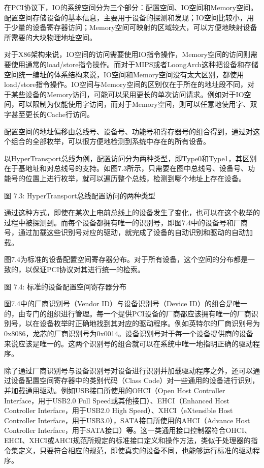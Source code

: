\documentclass[]{ctexbook}
\begin{document}
在PCI协议下，IO的系统空间分为三个部分：配置空间、IO空间和Memory空间。配置空间存储设备的基本信息，主要用于设备的探测和发现；IO空间比较小，用于少量的设备寄存器访问；Memory空间可映射的区域较大，可以方便地映射设备所需要的大块物理地址空间。

对于X86架构来说，IO空间的访问需要使用IO指令操作，Memory空间的访问则需要使用通常的load/store指令操作。而对于MIPS或者LoongArch这种把设备和存储空间统一编址的体系结构来说，IO空间和Memory空间没有太大区别，都使用load/store指令操作。IO空间与Memory空间的区别仅在于所在的地址段不同，对于某些设备的Memory访问，可能可以采用更长的单次访问请求。例如对于IO空间，可以限制为仅能使用字访问，而对于Memory空间，则可以任意地使用字、双字甚至更长的Cache行访问。

配置空间的地址偏移由总线号、设备号、功能号和寄存器号的组合得到，通过对这个组合的全部枚举，可以很方便地检测到系统中存在的所有设备。

以HyperTransport总线为例，配置访问分为两种类型，即Type0和Type1，其区别在于基地址和对总线号的支持。如图7.3所示，只需要在图中总线号、设备号、功能号的位置上进行枚举，就可以遍历整个总线，检测到哪个地址上存在设备。

图 7.3: HyperTransport总线配置访问的两种类型

通过这种方式，即使在某次上电前总线上的设备发生了变化，也可以在这个枚举的过程中被探测到。而每个设备都拥有唯一的识别号，即图7.4中的设备号和厂商号，通过加载这些识别号对应的驱动，就完成了设备的自动识别和驱动的自动加载。

图7.4为标准的设备配置空间寄存器分布。对于所有设备，这个空间的分布都是一致的，以保证PCI协议对其进行统一的检索。

图 7.4: 标准的设备配置空间寄存器分布

图7.4中的厂商识别号（Vendor ID）与设备识别号（Device ID）的组合是唯一的，由专门的组织进行管理。每一个提供PCI设备的厂商都应该拥有唯一的厂商识别号，以在设备枚举时正确地找到其对应的驱动程序。例如英特尔的厂商识别号为0x8086，龙芯的厂商识别号为0x0014。设备识别号对于每一个设备提供商的设备来说应该是唯一的。这两个识别号的组合就可以在系统中唯一地指明正确的驱动程序。

除了通过厂商识别号与设备识别号对设备进行识别并加载驱动程序之外，还可以通过设备配置空间寄存器中的类别代码（Class Code）对一些通用的设备进行识别，并加载通用驱动。例如USB接口所使用的OHCI（Open Host Controller Interface，用于USB2.0 Full Speed或其他接口）、EHCI（Enhanced Host Controller Interface，用于USB2.0 High Speed）、XHCI（eXtensible Host Controller Interface，用于USB3.0），SATA接口所使用的AHCI（Advance Host Controller Interface，用于SATA接口）等。这一类通用接口控制器符合OHCI、EHCI、XHCI或AHCI规范所规定的标准接口定义和操作方法，类似于处理器的指令集定义，只要符合相应的规范，即使真实的设备不同，也能够运行标准的驱动程序。
\end{document}
